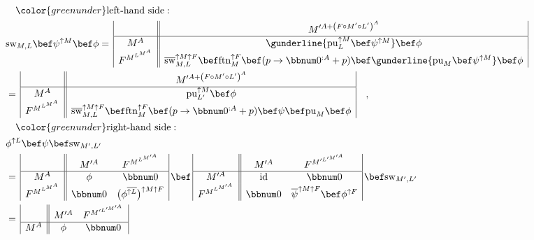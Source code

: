 \begin{align*}
 & \quad{\color{greenunder}\text{left-hand side}:}\quad\\
 & \text{sw}_{M,L}\bef\psi^{\uparrow M}\bef\phi=\,\begin{array}{|c||c|}
 & M^{\prime A+\left(F\circ M^{\prime}\circ L^{\prime}\right)^{A}}\\
\hline M^{A} & \gunderline{\text{pu}_{L}^{\uparrow M}\bef\psi^{\uparrow M}}\bef\phi\\
F^{M^{L^{M^{A}}}} & \overline{\text{sw}}_{M,L}^{\uparrow M\uparrow F}\bef\text{ftn}_{M}^{\uparrow F}\bef(p\rightarrow\bbnum 0^{:A}+p)\bef\gunderline{\text{pu}_{M}\bef\psi^{\uparrow M}}\bef\phi
\end{array}\\
 & =\,\begin{array}{|c||c|}
 & M^{\prime A+\left(F\circ M^{\prime}\circ L^{\prime}\right)^{A}}\\
\hline M^{A} & \text{pu}_{L^{\prime}}^{\uparrow M}\bef\phi\\
F^{M^{L^{M^{A}}}} & \overline{\text{sw}}_{M,L}^{\uparrow M\uparrow F}\bef\text{ftn}_{M}^{\uparrow F}\bef(p\rightarrow\bbnum 0^{:A}+p)\bef\psi\bef\text{pu}_{M}\bef\phi
\end{array}\quad,\\
 & \quad{\color{greenunder}\text{right-hand side}:}\quad\\
 & \phi^{\uparrow L}\bef\psi\bef\text{sw}_{M^{\prime},L^{\prime}}\\
 & =\,\begin{array}{|c||cc|}
 & M^{\prime A} & F^{M^{L^{M^{\prime A}}}}\\
\hline M^{A} & \phi & \bbnum 0\\
F^{M^{L^{M^{A}}}} & \bbnum 0 & \big(\phi^{\overline{\uparrow L}}\big)^{\uparrow M\uparrow F}
\end{array}\,\bef\,\begin{array}{|c||cc|}
 & M^{\prime A} & F^{M^{\prime L^{\prime M^{\prime A}}}}\\
\hline M^{\prime A} & \text{id} & \bbnum 0\\
F^{M^{L^{M^{\prime A}}}} & \bbnum 0 & \overline{\psi}^{\uparrow M\uparrow F}\bef\phi^{\uparrow F}
\end{array}\,\bef\text{sw}_{M^{\prime},L^{\prime}}\\
 & =\,\begin{array}{|c||cc|}
 & M^{\prime A} & F^{M^{\prime L^{\prime M^{\prime A}}}}\\
\hline M^{A} & \phi & \bbnum 0\\

\end{array}
\end{align*}
